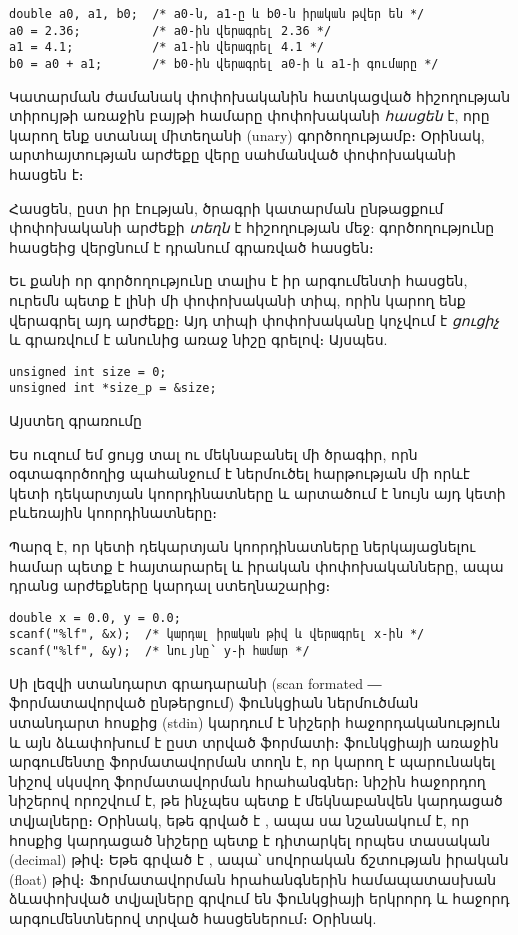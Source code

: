 \begin{Verbatim}
double a0, a1, b0;  /* a0-ն, a1-ը և b0-ն իրական թվեր են */
a0 = 2.36;          /* a0-ին վերագրել 2.36 */
a1 = 4.1;           /* a1-ին վերագրել 4.1 */
b0 = a0 + a1;       /* b0-ին վերագրել a0-ի և a1-ի գումարը */
\end{Verbatim}

Կատարման ժամանակ փոփոխականին հատկացված հիշողության տիրույթի առաջին
բայթի համարը փոփոխականի \emph{հասցեն} է, որը
կարող ենք ստանալ \code{\&} միտեղանի (unary) գործողությամբ։
Օրինակ,  արտհայտության արժեքը վերը սահմանված 
փոփոխականի հասցեն է։


Հասցեն, ըստ իր էության, ծրագրի կատարման ընթացքում փոփոխականի արժեքի
\emph{տեղն} է հիշողության մեջ: \code{*} գործողությունը հասցեից վերցնում
է դրանում գրառված հասցեն։

Եւ քանի որ \code{\&} գործողությունը
տալիս է իր արգումենտի հասցեն, ուրեմն պետք է լինի մի փոփոխականի տիպ,
որին կարող ենք վերագրել այդ արժեքը։ Այդ տիպի փոփոխականը կոչվում է
\emph{ցուցիչ} և գրառվում է անունից առաջ \code{*}
նիշը գրելով։ Այսպես.

\begin{Verbatim}
unsigned int size = 0;
unsigned int *size_p = &size;
\end{Verbatim}

Այստեղ  գրառումը

Ես ուզում եմ ցույց տալ ու մեկնաբանել մի ծրագիր, որն օգտագործողից
պահանջում է ներմուծել հարթության մի որևէ կետի դեկարտյան կոորդինատները և
արտածում է նույն այդ կետի բևեռային կոորդինատները։

Պարզ է, որ կետի դեկարտյան կոորդինատները ներկայացնելու համար պետք է
հայտարարել  և  իրական փոփոխականները, ապա դրանց
արժեքները կարդալ ստեղնաշարից։

\begin{Verbatim}
double x = 0.0, y = 0.0;
scanf("%lf", &x);  /* կարդալ իրական թիվ և վերագրել x-ին */
scanf("%lf", &y);  /* նույնը՝ y-ի համար */
\end{Verbatim}

Սի լեզվի ստանդարտ գրադարանի  (scan formated
― ֆորմատավորված ընթերցում) ֆունկցիան ներմուծման ստանդարտ հոսքից (stdin)
կարդում է նիշերի հաջորդականություն և այն ձևափոխում է ըստ տրված ֆորմատի։
 ֆունկցիայի առաջին արգումենտը ֆորմատավորման տողն է, որ
կարող է պարունակել \code{\%} նիշով սկսվող ֆորմատավորման հրահանգներ։
\code{\%} նիշին հաջորդող նիշերով որոշվում է, թե ինչպես պետք է
մեկնաբանվեն կարդացած տվյալները։ Օրինակ, եթե գրված է , ապա
սա նշանակում է, որ հոսքից կարդացած նիշերը պետք է դիտարկել որպես
տասական (decimal) թիվ։ Եթե գրված է , ապա՝ սովորական ճշտության
իրական (float) թիվ։ Ֆորմատավորման հրահանգներին համապատասխան ձևափոխված
տվյալները գրվում են  ֆունկցիայի երկրորդ և հաջորդ արգումենտներով
տրված հասցեներում։ Օրինակ.

